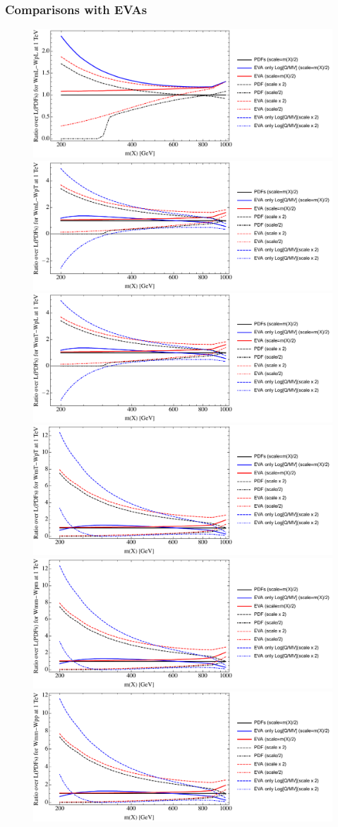 \documentclass[a4paper,11pt]{article}
\begin{document}
\clearpage
\subsubsection{Comparisons with EVAs}


\begin{figure}[ht]
\includegraphics[width=0.4\linewidth]{PlotLumi/1TeV/ratios/WmL-WpL.pdf}
\includegraphics[width=0.4\linewidth]{PlotLumi/1TeV/ratios/WmL-WpT.pdf}
\includegraphics[width=0.4\linewidth]{PlotLumi/1TeV/ratios/WmT-WpL.pdf}
\includegraphics[width=0.4\linewidth]{PlotLumi/1TeV/ratios/WmT-WpT.pdf}
\includegraphics[width=0.4\linewidth]{PlotLumi/1TeV/ratios/Wmm-Wpm.pdf}
\includegraphics[width=0.4\linewidth]{PlotLumi/1TeV/ratios/Wmm-Wpp.pdf}
\end{figure}
\end{document}
